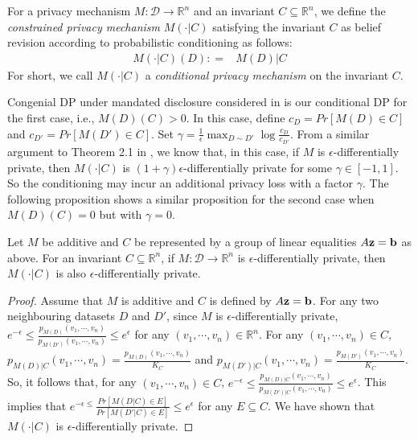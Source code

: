 \documentclass[11pt]{article}
\begin{document}
\begin{enumerate}
\end{enumerate}

\begin{definition}
For a privacy mechanism $M: \mathcal{D}\rightarrow \mathbb{R}^n$ and an invariant $C\subseteq \mathbb{R}^n$, we define the \emph{constrained privacy mechanism} $M(\cdot| C)$ satisfying the invariant $C$ as belief revision according to probabilistic conditioning as follows:
	\begin{align}
		M(\cdot | C) (D): = & M(D) | C
	\end{align}
For short, we call $M(\cdot |C)$ a \emph{conditional privacy mechanism} on  the invariant $C$.  

\end{definition}
Congenial DP under mandated disclosure considered in \cite{GongM20} is our conditional DP for the first case, i.e.,  $M(D)(C) >0$. In this case, 
define $c_{D} = Pr[M(D) \in C]$ and $c_{D'} = Pr[M(D')\in C]$. Set $\gamma = \frac{1}{\epsilon} \max_{D \sim D'}\log\frac{c_{D}}{c_{D'}}$.  From a similar argument to Theorem 2.1 in \cite{GongM20}, we know that, in this case, if $M$ is $\epsilon$-differentially private, then $M(\cdot |C)$ is $(1+\gamma)\epsilon$-differentially private for some $\gamma\in [-1, 1]$. So the conditioning may incur an additional privacy loss with a factor $\gamma$. 
The following proposition shows a similar proposition for the second case when $M(D)(C) =0$ but with $\gamma=0$. 

\begin{lemma} \label{lem: conditioning-privacy-preserving}  Let $M$ be additive and $C$ be represented by a group of linear equalities $A\bold{z}=\bold{b}$ as above.  For an invariant $C\subseteq \mathbb{R}^n$, if $M: \mathcal{D}\rightarrow \mathbb{R}^n$ is $\epsilon$-differentially private, then $M(\cdot| C)$ is also $\epsilon$-differentially private. 
\end{lemma}

\begin{proof} Assume that $M$ is additive and $C$ is defined by $A\bold{z} = \bold{b}$.  For any two neighbouring datasets $D$ and $D'$, since $M$ is $\epsilon$-differentially private, 
$ e^{-\epsilon} \leq \frac{p_{M(D)}(v_1, \cdots, v_n)}{p_{M(D')}(v_1, \cdots, v_n)} \leq e^{\epsilon}$
for any $(v_1, \cdots, v_n)\in \mathbb{R}^n$.  For any $(v_1, \cdots, v_n)\in C$, $p_{M(D)|C}(v_1, \cdots, v_n) = \frac{p_{M(D)}(v_1, \cdots, v_n)}{K_C}$ and $p_{M(D')|C}(v_1, \cdots, v_n) = \frac{p_{M(D')}(v_1, \cdots, v_n)}{K_C}$. So, it follows that, for any $(v_1, \cdots, v_n)\in C$, 
$ e^{-\epsilon} \leq \frac{p_{M(D)|C}(v_1, \cdots, v_n)}{p_{M(D')|C}(v_1, \cdots, v_n)} \leq e^{\epsilon}$. 
This implies that $e^{-\epsilon \leq }\frac{Pr[M(D|C)\in E]}{Pr[M(D'|C)\in E]} \leq e^{\epsilon}$ for any $E \subseteq C$.  We have shown that $M(\cdot |C)$ is $\epsilon$-differentially private.

\end{proof}
\end{document}
